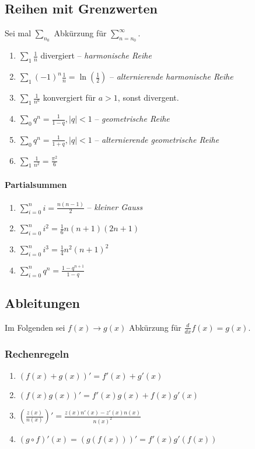 \documentclass[a4paper, 9pt, DIV=24]{scrartcl}
\begin{document}
\subsection{Reihen mit Grenzwerten}
Sei mal $\sum_{n_0}$ Abkürzung für $\sum_{n=n_0}^\infty$.
\begin{enumerate}[label={(}\arabic*{)}]
 \item $\sum_1 \frac{1}{n}$ divergiert -- \emph{harmonische Reihe}
 \item $\sum_1 (-1)^n\frac{1}{n} = \ln(\frac{1}{2})$ -- \emph{alternierende harmonische Reihe}
 \item $\sum_1 \frac{1}{n^a}$ konvergiert für $a > 1$, sonst divergent.
 \item $\sum_0 q^n = \frac{1}{1-q}, |q| < 1$ -- \emph{geometrische Reihe}
 \item $\sum_0 q^n = \frac{1}{1+q}, |q| < 1$ -- \emph{alternierende geometrische Reihe}
 \item $\sum_1 \frac{1}{n^2} = \frac{\pi^2}{6}$
\end{enumerate}
\paragraph{Partialsummen}
\begin{enumerate}[label={(}\arabic*{)}]
 \item $\sum_{i=0}^n i = \frac{n(n-1)}{2}$ -- \emph{kleiner Gauss}
 \item $\sum_{i=0}^n i^2 = \frac{1}{6}n(n+1)(2n+1)$
 \item $\sum_{i=0}^n i^3 = \frac{1}{4}n^2(n+1)^2$
 \item $\sum_{i=0}^n q^n = \frac{1-q^{n+1}}{1-q}$
\end{enumerate}

\clearpage

\subsection{Ableitungen}
Im Folgenden sei $f(x) \rightarrow g(x)$ Abkürzung für $\frac{d}{dx} f(x) = g(x)$.
\subsubsection{Rechenregeln}
\begin{enumerate}[label={(}\arabic*{)}]
 \item $(f(x)+g(x))' = f'(x) + g'(x)$
 \item $(f(x)g(x))' = f'(x)g(x) + f(x)g'(x)$
 \item $(\frac{z(x)}{n(x)})' = \frac{z(x)n'(x) - z'(x)n(x)}{n(x)^2}$
 \item $(g \circ f)'(x) = (g(f(x)))' = f'(x)g'(f(x))$
\end{enumerate}
\end{document}
